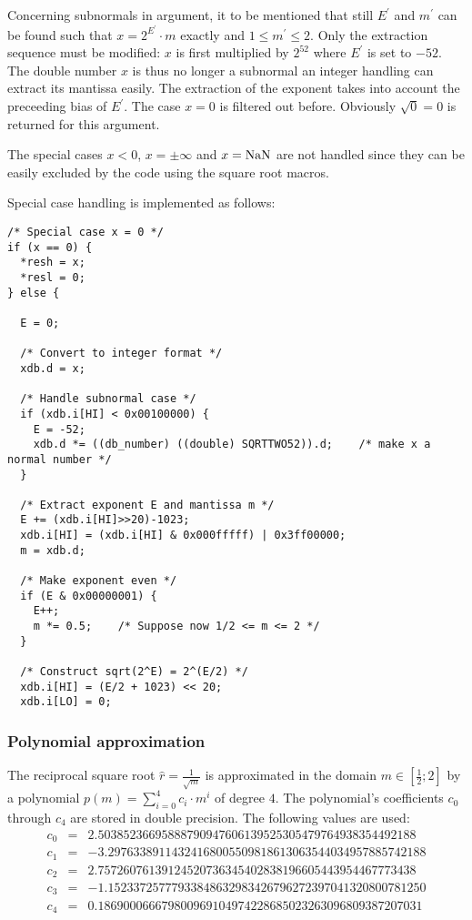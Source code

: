 Concerning subnormals in argument, it to be mentioned that still
$E^\prime$ and $m^\prime$ can be found such that $x = 2^{E^\prime}
\cdot m$ exactly and $1 \leq m^\prime \leq 2$. Only the extraction
sequence must be modified: $x$ is first multiplied by $2^{52}$ where
$E^\prime$ is set to $-52$. The double number $x$ is thus no longer a
subnormal an integer handling can extract its mantissa easily. The
extraction of the exponent takes into account the preceeding bias of
$E^\prime$. The case $x = 0$ is filtered out before. Obviously
$\sqrt{0} = 0$ is returned for this argument.

The special cases $x < 0$, $x = \pm \infty$ and $x = \mathrm{NaN}$ are not
handled since they can be easily excluded by the code using the square
root macros.

Special case handling is implemented as follows:
\begin{lstlisting}[caption={Special case handling},firstnumber=1]
/* Special case x = 0 */
if (x == 0) {
  *resh = x;
  *resl = 0;
} else {

  E = 0;

  /* Convert to integer format */
  xdb.d = x;

  /* Handle subnormal case */
  if (xdb.i[HI] < 0x00100000) {
    E = -52;
    xdb.d *= ((db_number) ((double) SQRTTWO52)).d; 	  /* make x a normal number */
  }

  /* Extract exponent E and mantissa m */
  E += (xdb.i[HI]>>20)-1023;
  xdb.i[HI] = (xdb.i[HI] & 0x000fffff) | 0x3ff00000;
  m = xdb.d;

  /* Make exponent even */
  if (E & 0x00000001) {
    E++;
    m *= 0.5;    /* Suppose now 1/2 <= m <= 2 */
  }

  /* Construct sqrt(2^E) = 2^(E/2) */
  xdb.i[HI] = (E/2 + 1023) << 20;
  xdb.i[LO] = 0;
\end{lstlisting}

\subsubsection{Polynomial approximation}
The reciprocal square root $\hat{r} = \frac{1}{\sqrt{m}}$ is
approximated in the domain $m \in \left[ \frac{1}{2}; 2 \right]$ by a
polynomial $p\left( m \right) = \sum\limits_{i=0}^4 c_i \cdot m^i$ of
degree $4$. The polynomial's coefficients $c_0$ through $c_4$ are
stored in double precision.  The following values are used:
\begin{eqnarray*}
c_0 & = & 2.50385236695888790947606139525305479764938354492188 \\
c_1 & = & -3.29763389114324168005509818613063544034957885742188  \\
c_2 & = & 2.75726076139124520736345402838196605443954467773438   \\
c_3 & = & -1.15233725777933848632983426796272397041320800781250  \\
c_4 & = & 0.186900066679800969104974228685023263096809387207031
\end{eqnarray*}

